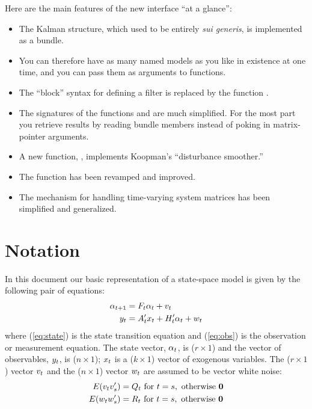 Here are the main features of the new interface ``at a glance'':
%
\begin{itemize}
\item The Kalman structure, which used to be entirely \textit{sui
    generis}, is implemented as a bundle.
\item You can therefore have as many named models as you like in
  existence at one time, and you can pass them as arguments to
  functions.
\item The ``block'' syntax for defining a filter is replaced by the
  function .
\item The signatures of the functions  and 
  are much simplified. For the most part you retrieve results by
  reading bundle members instead of poking in matrix-pointer
  arguments.
\item A new function, , implements Koopman's
  ``disturbance smoother.''
\item The  function has been revamped and improved.
\item The mechanism for handling time-varying system matrices has been
  simplified and generalized.
\end{itemize}

\section{Notation}

In this document our basic representation of a state-space model is
given by the following pair of equations:
%
\begin{align}
  \label{eq:state}
  \alpha_{t+1} &= F_t \alpha_t + v_t \\
  \label{eq:obs}
  y_t &= A_t'x_t + H_t' \alpha_t +
  w_t 
\end{align}
%
where (\ref{eq:state}) is the state transition equation and
(\ref{eq:obs}) is the observation or measurement equation.  The state
vector, $\alpha_{t}$, is ($r \times 1$) and the vector of
observables, $y_t$, is ($n \times 1$); $x_t$ is a ($k
\times 1$) vector of exogenous variables.  The ($r \times 1$) vector
$v_t$ and the ($n \times 1$) vector $w_t$ are assumed to
be vector white noise:
%
\begin{align*}
E(v_t v_s') &= Q_t \mbox{ for } t = s, 
    \mbox{ otherwise } \mathbf{0} \\
E(w_t w_s') &= R_t \mbox{ for } t = s, 
    \mbox{ otherwise } \mathbf{0}
\end{align*}

